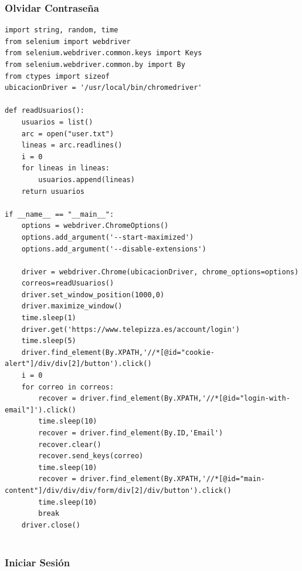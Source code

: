 \documentclass[]{article}
\begin{document}
\subsubsection{Olvidar Contraseña}
\begin{lstlisting}[lenguaje=py]
import string, random, time
from selenium import webdriver
from selenium.webdriver.common.keys import Keys
from selenium.webdriver.common.by import By
from ctypes import sizeof
ubicacionDriver = '/usr/local/bin/chromedriver'

def readUsuarios():
    usuarios = list()
    arc = open("user.txt")
    lineas = arc.readlines()
    i = 0   
    for lineas in lineas:
        usuarios.append(lineas)
    return usuarios

if __name__ == "__main__":
    options = webdriver.ChromeOptions()
    options.add_argument('--start-maximized')
    options.add_argument('--disable-extensions')

    driver = webdriver.Chrome(ubicacionDriver, chrome_options=options)
    correos=readUsuarios()
    driver.set_window_position(1000,0)
    driver.maximize_window()
    time.sleep(1)
    driver.get('https://www.telepizza.es/account/login')
    time.sleep(5)
    driver.find_element(By.XPATH,'//*[@id="cookie-alert"]/div/div[2]/button').click()
    i = 0
    for correo in correos:
        recover = driver.find_element(By.XPATH,'//*[@id="login-with-email"]').click()        
        time.sleep(10)
        recover = driver.find_element(By.ID,'Email')
        recover.clear()
        recover.send_keys(correo)
        time.sleep(10)
        recover = driver.find_element(By.XPATH,'//*[@id="main-content"]/div/div/div/form/div[2]/div/button').click()
        time.sleep(10)
        break
    driver.close()


\end{lstlisting}

\subsubsection{ Iniciar Sesión}
\end{document}
